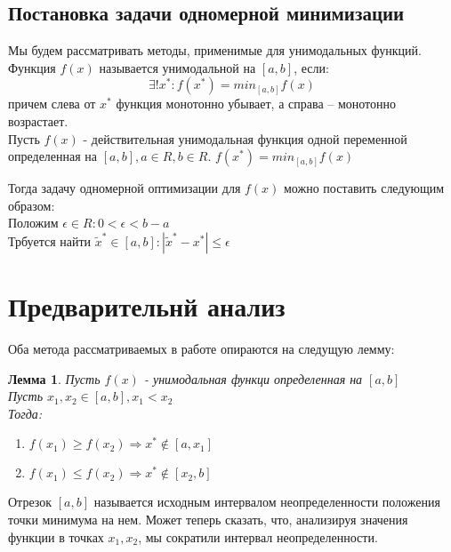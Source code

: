 \documentclass[12pt]{article}
\newtheorem{theorem}{Лемма}
\begin{document}
\subsection{Постановка задачи одномерной минимизации}
    Мы будем рассматривать методы, применимые для унимодальных функций. Функция $f(x)$ называется унимодальной на $[a,b]$, если:\\
    \begin{equation}
        \exists ! x^{*}: f(x^{*})=min_{[a,b]} f(x)
    \end{equation}
    причем слева от $x^{*}$ функция монотонно убывает, а справа – монотонно возрастает.\\
    Пусть $f(x)$ - действительная унимодальная функция одной переменной определенная на $[a,b],  a\in R, b\in R$. $f(x^{*})=min_{[a,b]} f(x)$
    
    Тогда задачу одномерной оптимизации для $f(x)$ можно поставить следующим образом:\\
    Положим $\epsilon \in R : 0< \epsilon < b-a$\\
    Трбуется найти
    $\tilde x^{*} \in [a,b]: |\tilde x^{*} - x^{*}|\leq \epsilon $\\
    
\section{Предварительнй анализ}
Оба метода рассматриваемых в работе опираются на следущую лемму:\\
\begin{theorem}\label{t1}
Пусть $f(x)$ - унимодальная функци определенная на $[a,b]$\\
Пусть $x_1, x_2 \in [a,b], x_1 < x_2$\\
Тогда:\\
\begin{enumerate}
    \item $f(x_1)\geq f(x_2) \Rightarrow x^{*} \notin [a,x_1]$
    \item $f(x_1)\leq f(x_2) \Rightarrow x^{*} \notin [x_2,b]$
\end{enumerate}
\end{theorem}

Отрезок $[a,b]$ называется исходным интервалом неопределенности положения
точки минимума на нем. Может теперь сказать, что, анализируя значения функции в точках $x_1, x_2$, мы
сократили интервал неопределенности.\\
\end{document}
